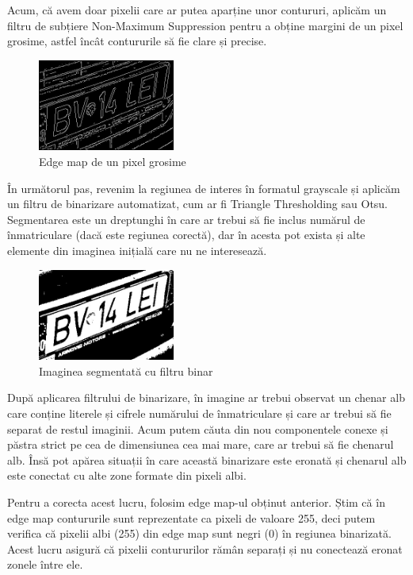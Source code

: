 \documentclass[a4paper,12pt]{report}
\begin{document}
Acum, că avem doar pixelii care ar putea aparține unor contururi, aplicăm un filtru de subțiere Non-Maximum Suppression pentru a obține margini de un pixel grosime, astfel încât contururile să fie clare și precise.

\begin{figure}[h!]
    \centering
    \includegraphics[width=0.4\textwidth]{images/non_maximum_suppression.jpg}
    \caption{Edge map de un pixel grosime}
\end{figure}
\FloatBarrier

În următorul pas, revenim la regiunea de interes în formatul grayscale și aplicăm un filtru de binarizare automatizat, cum ar fi Triangle Thresholding sau Otsu. Segmentarea este un dreptunghi în care ar trebui să fie inclus numărul de înmatriculare (dacă este regiunea corectă), dar în acesta pot exista și alte elemente din imaginea inițială care nu ne interesează.

\begin{figure}[h!]
    \centering
    \includegraphics[width=0.4\textwidth]{images/before_roi.jpg}
    \caption{Imaginea segmentată cu filtru binar}
\end{figure}
\FloatBarrier

După aplicarea filtrului de binarizare, în imagine ar trebui observat un chenar alb care conține literele și cifrele numărului de înmatriculare și care ar trebui să fie separat de restul imaginii. Acum putem căuta din nou componentele conexe și păstra strict pe cea de dimensiunea cea mai mare, care ar trebui să fie chenarul alb. Însă pot apărea situații în care această binarizare este eronată și chenarul alb este conectat cu alte zone formate din pixeli albi.

Pentru a corecta acest lucru, folosim edge map-ul obținut anterior. Știm că în edge map contururile sunt reprezentate ca pixeli de valoare 255, deci putem verifica că pixelii albi (255) din edge map sunt negri (0) în regiunea binarizată. Acest lucru asigură că pixelii contururilor rămân separați și nu conectează eronat zonele între ele.
\end{document}

